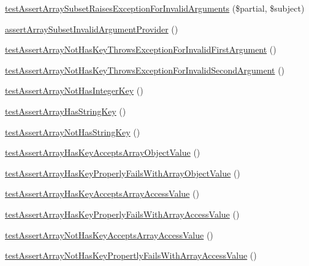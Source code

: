 \begin{DoxyCompactItemize}
\item 
\mbox{\hyperlink{class_framework___assert_test_a5f5da8a44bf68fea425804e6ac999ad3}{test\+Assert\+Array\+Subset\+Raises\+Exception\+For\+Invalid\+Arguments}} (\$partial, \$subject)
\item 
\mbox{\hyperlink{class_framework___assert_test_a4cee47f521df41bed35de7edab45f814}{assert\+Array\+Subset\+Invalid\+Argument\+Provider}} ()
\item 
\mbox{\hyperlink{class_framework___assert_test_a204b1740ae5b8863f69333247a4e39fe}{test\+Assert\+Array\+Not\+Has\+Key\+Throws\+Exception\+For\+Invalid\+First\+Argument}} ()
\item 
\mbox{\hyperlink{class_framework___assert_test_aad310e90e6ea0c9d03709e05ee5727b8}{test\+Assert\+Array\+Not\+Has\+Key\+Throws\+Exception\+For\+Invalid\+Second\+Argument}} ()
\item 
\mbox{\hyperlink{class_framework___assert_test_ac3056ca6d5ad604ec49930f8e34d0db2}{test\+Assert\+Array\+Not\+Has\+Integer\+Key}} ()
\item 
\mbox{\hyperlink{class_framework___assert_test_a397bbb139540ddcaf0036ea1e36d638b}{test\+Assert\+Array\+Has\+String\+Key}} ()
\item 
\mbox{\hyperlink{class_framework___assert_test_a602dd4fb0b16db958f77443b78530bef}{test\+Assert\+Array\+Not\+Has\+String\+Key}} ()
\item 
\mbox{\hyperlink{class_framework___assert_test_a16a9c6410a9ebdb8ce0b16fab7764127}{test\+Assert\+Array\+Has\+Key\+Accepts\+Array\+Object\+Value}} ()
\item 
\mbox{\hyperlink{class_framework___assert_test_aca2d87e845f5a9869025d27f7d84fbeb}{test\+Assert\+Array\+Has\+Key\+Properly\+Fails\+With\+Array\+Object\+Value}} ()
\item 
\mbox{\hyperlink{class_framework___assert_test_a38fb93f45cc5c98d7f8c1c2e2908d90a}{test\+Assert\+Array\+Has\+Key\+Accepts\+Array\+Access\+Value}} ()
\item 
\mbox{\hyperlink{class_framework___assert_test_a7fa86a121b68a707026f78d91ebf548f}{test\+Assert\+Array\+Has\+Key\+Properly\+Fails\+With\+Array\+Access\+Value}} ()
\item 
\mbox{\hyperlink{class_framework___assert_test_ad530b832a36001003cb7fa10894b1ac5}{test\+Assert\+Array\+Not\+Has\+Key\+Accepts\+Array\+Access\+Value}} ()
\item 
\mbox{\hyperlink{class_framework___assert_test_ac62ebbe8afce647dee7583375e82b394}{test\+Assert\+Array\+Not\+Has\+Key\+Propertly\+Fails\+With\+Array\+Access\+Value}} ()

\end{DoxyCompactItemize}
